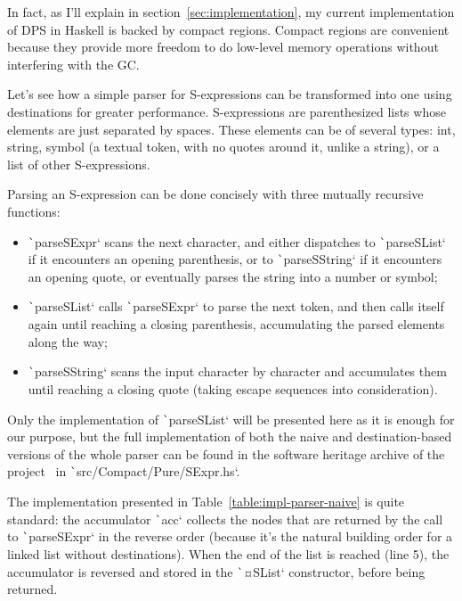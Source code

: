 \documentclass[english]{jflart}
\begin{document}
In fact, as I'll explain in section~\ref{sec:implementation}, my current implementation of DPS in Haskell is backed by compact regions. Compact regions are convenient because they provide more freedom to do low-level memory operations without interfering with the GC.

Let's see how a simple parser for S-expressions can be transformed into one using destinations for greater performance. S-expressions are parenthesized lists whose elements are just separated by spaces. These elements can be of several types: int, string, symbol (a textual token, with no quotes around it, unlike a string), or a list of other S-expressions.

Parsing an S-expression can be done concisely with three mutually recursive functions:
\begin{itemize}
  \item \texttt`parseSExpr` scans the next character, and either dispatches to \texttt`parseSList` if it encounters an opening parenthesis, or to \texttt`parseSString` if it encounters an opening quote, or eventually parses the string into a number or symbol;
  \item \texttt`parseSList` calls \texttt`parseSExpr` to parse the next token, and then calls itself again until reaching a closing parenthesis, accumulating the parsed elements along the way;
  \item \texttt`parseSString` scans the input character by character and accumulates them until reaching a closing quote (taking escape sequences into consideration).
\end{itemize}

Only the implementation of \texttt`parseSList` will be presented here as it is enough for our purpose, but the full implementation of both the naive and destination-based versions of the whole parser can be found in the software heritage archive of the project~\cite{linear_dest} in \texttt`src/Compact/Pure/SExpr.hs`.

The implementation presented in Table~\ref{table:impl-parser-naive} is quite standard: the accumulator \texttt`acc` collects the nodes that are returned by the call to \texttt`parseSExpr` in the reverse order (because it's the natural building order for a linked list without destinations). When the end of the list is reached (line 5), the accumulator is reversed and stored in the \texttt`¤SList` constructor, before being returned.
\end{document}

